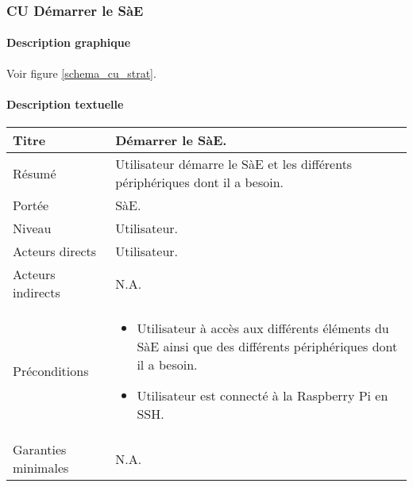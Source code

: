 \newpage
\subsubsection{CU Démarrer le SàE}
\paragraph{Description graphique}
Voir figure \ref{schema_cu_strat}.
\paragraph{Description textuelle}
\medskip

\begin{longtable}[l]{|p{3cm}|p{11.7cm}|}
    \hline
    
        Titre & Démarrer le SàE.\\
    \hline

        Résumé & Utilisateur démarre le SàE et les différents périphériques dont il a besoin. \\
    \hline

        Portée & SàE.\\
    \hline

        Niveau & Utilisateur.\\
    \hline

        Acteurs directs & Utilisateur.\\
    \hline 

        Acteurs indirects & N.A. \\
    \hline

        Préconditions & 
        \begin{itemize}
            \item Utilisateur à accès aux différents éléments du SàE ainsi que des différents périphériques dont il a besoin.
            \item Utilisateur est connecté à la Raspberry Pi en SSH.
        \end{itemize} \\ 
    \hline

        Garanties \newline minimales & N.A. \\
    \hline


\end{longtable}
